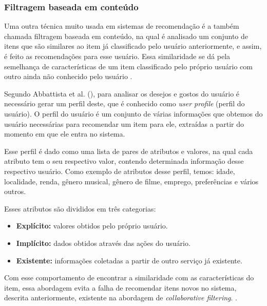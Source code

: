 \subsubsection{Filtragem baseada em conteúdo}
\label{Contentbasedfiltering}

Uma outra técnica muito usada em sistemas de recomendação é a também chamada filtragem baseada em conteúdo, na qual é analisado um conjunto de itens que são similares ao item já classificado pelo usuário anteriormente, e assim, é feito as recomendações para esse usuário. Essa similaridade se dá pela semelhança de características de um item classificado pelo próprio usuário com outro ainda não conhecido pelo usuário \cite{Grimaldi:2018}. 

Segundo Abbattista et al. (\citeyear{Abbattista:2002}), para analisar os desejos e gostos do usuário é necessário gerar um perfil deste, que é conhecido como \textit{user profile} (perfil do usuário). O perfil do usuário é um conjunto de várias informações que obtemos do usuário necessárias para recomendar um item para ele, extraídas a partir do momento em que ele entra no sistema.

Esse perfil é dado como uma lista de pares de atributos e valores, na qual cada atributo tem o seu respectivo valor, contendo determinada informação desse respectivo usuário. Como exemplo de atributos desse perfil, temos: idade, localidade, renda, gênero musical, gênero de filme, emprego, preferências e vários outros.

Esses atributos são divididos em três categorias:
\begin{itemize}
    \item \textbf{Explícito:} valores obtidos pelo próprio usuário.

    \item \textbf{Implícito:} dados obtidos através das ações do usuário.

    \item \textbf{Existente:} informações coletadas a partir de outro serviço já existente.
\end{itemize}

Com esse comportamento de encontrar a similaridade com as características do item, essa abordagem evita a falha de recomendar itens novos no sistema, descrita anteriormente, existente na abordagem de \textit{collaborative filtering}. \cite{Luk:2019}.

